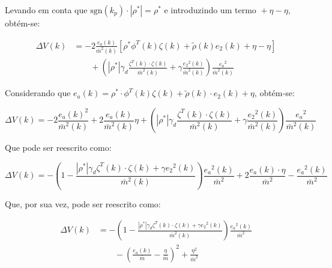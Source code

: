   Levando em conta que $\mathrm{sgn}(k_p)\cdot|\rho^*|=\rho^*$ e introduzindo um termo ${}+ \eta - \eta$, obtém-se:

  \begin{equation*}
    \begin{split}
      \Delta V(k) &= -2 \frac{e_a(k)}{{\bar{m}}^2(k)} \left[ \rho^* \phi^T(k) \zeta(k)
          + \tilde{\rho}(k) e_2(k) + \eta - \eta \right] \\
          &\qquad {}+ \left( |\rho^*| \gamma_d \frac{\zeta^T(k) \cdot \zeta(k)}{{\bar{m}}^2(k)}
          + \gamma \frac{{e_2}^2(k)}{{\bar{m}}^2(k)} \right) \frac{{e_a}^2}{{\bar{m}}^2(k)}
    \end{split}
  \end{equation*}

  Considerando que $e_a(k) = \rho^* \cdot \phi^T(k) \zeta(k) + \tilde{\rho}(k) \cdot e_2(k) + \eta$, obtém-se:

  \begin{equation*}
    \Delta V(k) = -2 \frac{e_a(k)^2}{{\bar{m}}^2(k)} +2 \frac{e_a(k)}{{\bar{m}}^2(k)} \eta
        + \left( |\rho^*| \gamma_d \frac{\zeta^T(k) \cdot \zeta(k)}{{\bar{m}}^2(k)}
        + \gamma \frac{{e_2}^2(k)}{{\bar{m}}^2(k)} \right) \frac{{e_a}^2}{{\bar{m}}^2(k)}
  \end{equation*}

  Que pode ser reescrito como:

  \begin{equation*}
    \Delta V(k) = - \left( 1 - \frac{|\rho^*| \gamma_d \zeta^T(k) \cdot \zeta(k)
        + \gamma {e_2}^2(k)}{{\bar{m}}^2(k)} \right) \frac{{e_a}^2(k)}{{\bar{m}}^2}
        + 2 \frac{e_a(k) \cdot \eta}{{\bar{m}}^2} - \frac{{e_a}^2(k)}{{\bar{m}}^2}
  \end{equation*}

  Que, por sua vez, pode ser reescrito como:

  \begin{equation}
    \begin{split}
      \Delta V(k) &= - \left( 1 - \frac{|\rho^*| \gamma_d \zeta^T(k) \cdot \zeta(k)
      + \gamma {e_2}^2(k)}{{\bar{m}}^2(k)} \right) \frac{{e_a}^2(k)}{{\bar{m}}^2} \\
      &\qquad {}- {\left( \frac{e_a(k)}{\bar{m}} - \frac{\eta}{\bar{m}} \right)}^2 + \frac{\eta^2}{{\bar{m}}^2}
    \end{split}
  \end{equation}

